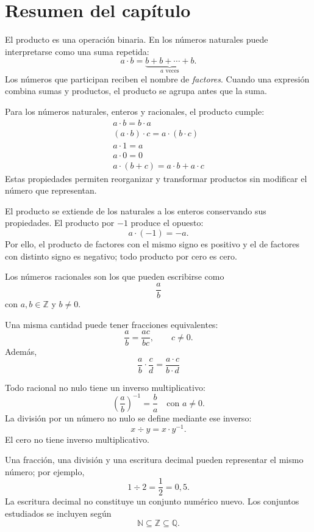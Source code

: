 \section{Resumen del capítulo}

\begin{tcolorbox}[resumen,title=Producto]
El producto es una operación binaria. En los números naturales puede interpretarse como una suma repetida:
\[
a\cdot b=\underbrace{b+b+\cdots+b}_{a\text{ veces}}.
\]
Los números que participan reciben el nombre de \emph{factores}. Cuando una expresión combina sumas y productos, el producto se agrupa antes que la suma.
\end{tcolorbox}

\begin{tcolorbox}[resumen,title=Propiedades del producto]
Para los números naturales, enteros y racionales, el producto cumple:
\begin{gather*}
a\cdot b=b\cdot a\\
(a\cdot b)\cdot c=a\cdot(b\cdot c)\\
a\cdot1=a\\
a\cdot0=0\\
a\cdot(b+c)=a\cdot b+a\cdot c
\end{gather*}
Estas propiedades permiten reorganizar y transformar productos sin modificar el número que representan.
\end{tcolorbox}

\begin{tcolorbox}[resumen,title=Producto de enteros]
El producto se extiende de los naturales a los enteros conservando sus propiedades. El producto por \(-1\) produce el opuesto:
\[
a\cdot(-1)=-a.
\]
Por ello, el producto de factores con el mismo signo es positivo y el de factores con distinto signo es negativo; todo producto por cero es cero.
\end{tcolorbox}

\begin{tcolorbox}[resumen,title=Números racionales]
Los números racionales son los que pueden escribirse como
\[
  \frac{a}{b}
\]
con \(a,b\in\mathbb Z\) y \(b\ne0\).

Una misma cantidad puede tener fracciones equivalentes:
\[
\frac{a}{b}=\frac{ac}{bc},\qquad c\ne0.
\]
Además,
\[
\frac{a}{b}\cdot\frac{c}{d}=\frac{a\cdot c}{b\cdot d}
\]
\end{tcolorbox}

\begin{tcolorbox}[resumen,title=Inverso y división]
Todo racional no nulo tiene un inverso multiplicativo:
\[
  \left(\frac{a}{b}\right)^{-1}=\frac{b}{a}\quad \text{con } a\ne0.
\]
La división por un número no nulo se define mediante ese inverso:
\[
x\div y=x\cdot y^{-1}.
\]
El cero no tiene inverso multiplicativo.
\end{tcolorbox}

\begin{tcolorbox}[resumen,title=Representaciones y conjuntos numéricos]
Una fracción, una división y una escritura decimal pueden representar el mismo número; por ejemplo,
\[
1\div2=\frac12=0{,}5.
\]
La escritura decimal no constituye un conjunto numérico nuevo. Los conjuntos estudiados se incluyen según
\[
\mathbb N\subseteq\mathbb Z\subseteq\mathbb Q.
\]
\end{tcolorbox}

